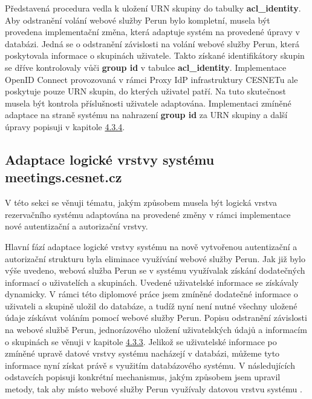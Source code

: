 \documentclass[
  printed, %
  twoside, %
  table,   %
  nolof,     %
  nolot,     %
]{fithesis3}
\begin{document}
Představená procedura vedla k uložení URN skupiny do tabulky \textbf{acl\_identity}. Aby odstranění volání webové služby Perun bylo kompletní, musela být provedena implementační změna, která adaptuje systém  na provedené úpravy v databázi. Jedná se o odstranění závislosti na volání webové služby Perun, která poskytovala informace o skupinách uživatele. Takto získané identifikátory skupin se dříve kontrolovaly vůči \textbf{group id} v tabulce \textbf{acl\_identity}. Implementace OpenID Connect provozovaná v rámci Proxy IdP infrastruktury CESNETu ale poskytuje pouze URN skupin, do kterých uživatel patří. Na tuto skutečnost musela být kontrola příslušnosti uživatele adaptována. Implementaci zmíněné adaptace na straně systému  na nahrazení \textbf{group id} za URN skupiny a další úpravy popisuji v kapitole \hyperref[ShongoImpl-web]{4.3.4}. 

\subsection[Adaptace logické vrstvy systému\break meetings.cesnet.cz]{Adaptace logické vrstvy systému meetings.cesnet.cz}
\label{ShongoImpl-web}
V této sekci se věnuji tématu, jakým způsobem musela být logická vrstva rezervačního systému  adaptována na provedené změny v rámci implementace nové autentizační a autorizační vrstvy. 
\par

Hlavní fází adaptace logické vrstvy systému  na nově vytvořenou autentizační a autorizační strukturu byla eliminace využívání webové služby Perun. Jak již bylo výše uvedeno, webová služba Perun se v systému  využívala\break k získání dodatečných informací o uživatelích a skupinách. Uvedené uživatelské informace se získávaly dynamicky. V rámci této diplomové práce jsem zmíněné dodatečné informace o uživateli a skupině uložil do databáze, a tudíž nyní není nutné všechny uložené údaje získávat voláním pomocí webové služby Perun. Popisu odstranění závislosti na webové službě Perun, jednorázového uložení uživatelských údajů a informacím o skupinách se věnuji v kapitole \hyperref[zpracovaniAUlozeniPerun]{4.3.3}. Jelikož se uživatelské informace po zmíněné upravě datové vrstvy systému  nacházejí v databázi, můžeme tyto informace nyní získat právě s využitím databázového systému. V následujících odstavcích popisuji konkrétní mechanismus, jakým způsobem jsem upravil metody, tak aby místo webové služby Perun využívaly datovou vrstvu systému . 
\end{document}
